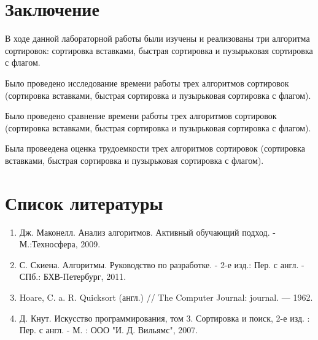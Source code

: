 \documentclass[a4paper,14pt]{report}
\begin{document}
\chapter*{Заключение}

В ходе данной лабораторной работы были изучены и реализованы три алгоритма сортировок: сортировка вставками, быстрая сортировка и пузырьковая сортировка с флагом.

Было проведено исследование времени работы трех алгоритмов сортировок (сортировка вставками, быстрая сортировка и пузырьковая сортировка с флагом).

Было проведено сравнение времени работы трех алгоритмов сортировок (сортировка вставками, быстрая сортировка и пузырьковая сортировка с флагом).

Была провеедена оценка трудоемкости трех алгоритмов сортировок (сортировка вставками, быстрая сортировка и пузырьковая сортировка с флагом).

\chapter*{Список литературы}

\begin{enumerate}
	\item Дж. Маконелл. Анализ алгоритмов. Активный обучающий подход. - М.:Техносфера, 2009.
	\item С. Скиена. Алгоритмы. Руководство по разработке. - 2-е изд.: Пер. с англ. - СПб.: БХВ-Петербург, 2011.
	\item Hoare, C. a. R. Quicksort (англ.) // The Computer Journal: journal. — 1962.
	\item Д. Кнут. Искусство программирования, том 3. Сортировка и поиск, 2-е изд. : Пер. с англ. - М. : ООО "И. Д. Вильямс", 2007.
\end{enumerate}
\end{document}
